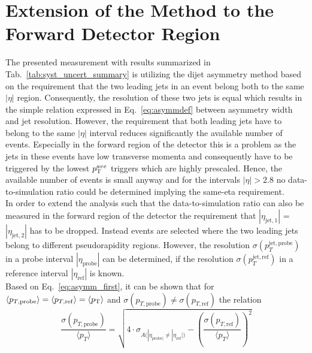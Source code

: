 \section{Extension of the Method to the Forward Detector Region}
\label{sec:jer_forward_extension}
The presented measurement with results summarized in Tab.~\ref{tab:syst_uncert_summary} is utilizing the dijet asymmetry method based on the requirement that the two leading jets in an event belong both to the same $|\eta|$ region. Consequently, the resolution of these two jets is equal which results in the simple relation expressed in Eq.~\ref{eq:asymmdef} between asymmetry width and jet resolution. However, the requirement that both leading jets have to belong to the same $|\eta|$ interval reduces significantly the available number of events. Especially in the forward region of the detector this is a problem as the jets in these events have low transverse momenta and consequently have to be triggered by the lowest $p_{\text{T}}^{ave}$ triggers which are highly prescaled. Hence, the available number of events is small anyway and for the intervals $|\eta| > 2.8$ no data-to-simulation ratio could be determined implying the same-eta requirement. \\
In order to extend the analysis such that the data-to-simulation ratio can also be measured in the forward region of the detector the requirement that $|\eta_{\mathrm{jet},1}|$ = $|\eta_{\mathrm{jet},2}|$ has to be dropped. Instead events are selected where the two leading jets belong to different pseudorapidity regions. However, the resolution $\sigma (p_{T}^{\mathrm{jet, probe}})$ in a probe interval $|\eta_\mathrm{probe}|$ can be determined, if the resolution $\sigma (p_{T}^{\mathrm{jet, ref}})$ in a reference interval $|\eta_\mathrm{ref}|$ is known. \\
Based on Eq.~\ref{eq:asymm_first}, it can be shown that for $\langle p_{T,\mathrm{probe}} \rangle = \langle p_{T,\mathrm{ref}} \rangle = \langle p_{\text{T}} \rangle$ and $\sigma (p_{T,\mathrm{probe}}) \neq \sigma (p_{T,\mathrm{ref}})$ the relation
\begin{equation}
 \label{eq:asymm_forward}
  \frac{\sigma (p_{T, \mathrm{probe}})}{\langle p_{T} \rangle} = \sqrt{4 \cdot \sigma_{A({|\eta_{\mathrm{probe}|} \neq |\eta_{\mathrm{ref}}|)}} - \left(\frac{\sigma (p_{T, \mathrm{ref}})}{\langle p_{T} \rangle} \right)^2} 
 \end{equation}
